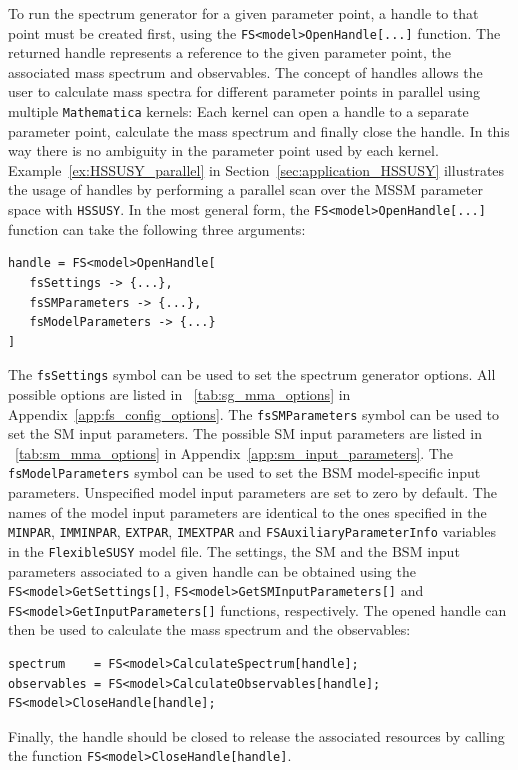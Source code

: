 \documentclass[final,3p,11pt,pdflatex]{elsarticle}
\makeatletter
\newcommand{\modelname}[1]{\texttt{#1}\@\xspace}
\newcommand{\fs}{\texttt{FlexibleSUSY}\@\xspace}
\newcommand{\HSSUSY}{\modelname{HSSUSY}}
\newcommand{\mathematica}{\texttt{Ma\-the\-ma\-ti\-ca}\xspace}
\newcommand{\code}[1]{\lstinline|#1|}  %
\newcommand{\BSM}{\ensuremath{\text{BSM}}\xspace}
\newcommand{\secref}[1]{Section~\ref{#1}}
\newcommand{\appref}[1]{Appendix~\ref{#1}}
\newcommand{\tabref}[1]{\tablename~\ref{#1}}
\newcommand{\exref}[1]{Example~\ref{#1}}
\makeatother
\begin{document}
To run the spectrum generator for a given parameter point, a handle to that point must be
created first, using the \code{FS<model>OpenHandle[...]} function.
%
The returned handle represents a reference to the given parameter
point, the associated mass spectrum and observables.  The concept of
handles allows the user to calculate mass spectra for different
parameter points in parallel using multiple \mathematica kernels: Each
kernel can open a handle to a separate parameter point, calculate the
mass spectrum and finally close the handle.  In this way there
is no ambiguity in the parameter point used by each kernel.
\exref{ex:HSSUSY_parallel} in \secref{sec:application_HSSUSY} illustrates the usage of handles by
performing a parallel scan over the MSSM parameter space with \HSSUSY.
%
In the most general form, the \code{FS<model>OpenHandle[...]} function
can take the following three arguments:
%
\begin{lstlisting}
handle = FS<model>OpenHandle[
   fsSettings -> {...},
   fsSMParameters -> {...},
   fsModelParameters -> {...}
]
\end{lstlisting}
%
The \code{fsSettings} symbol can be used to set the spectrum generator
options.  All possible options are listed in
\tabref{tab:sg_mma_options} in \appref{app:fs_config_options}.
%
The \code{fsSMParameters} symbol can be used to set the SM
input parameters.  The possible SM input parameters are
listed in \tabref{tab:sm_mma_options} in \appref{app:sm_input_parameters}.
%
The \code{fsModelParameters} symbol can be used to set the \BSM
model-specific input parameters.  Unspecified model input parameters
are set to zero by default.  The names of the model input parameters
are identical to the ones specified in the \code{MINPAR},
\code{IMMINPAR}, \code{EXTPAR}, \code{IMEXTPAR} and
\code{FSAuxiliaryParameterInfo} variables in the \fs model file.  The
settings, the SM and the \BSM input parameters
associated to a given handle can be obtained using the
\code{FS<model>GetSettings[]}, \code{FS<model>GetSMInputParameters[]}
and \code{FS<model>GetInputParameters[]} functions, respectively.  The
opened handle can then be used to calculate the mass spectrum and the
observables:
%
\begin{lstlisting}
spectrum    = FS<model>CalculateSpectrum[handle];
observables = FS<model>CalculateObservables[handle];
FS<model>CloseHandle[handle];
\end{lstlisting}
%
Finally, the handle should be closed to release the associated
resources by calling the function \code{FS<model>CloseHandle[handle]}.
\end{document}
